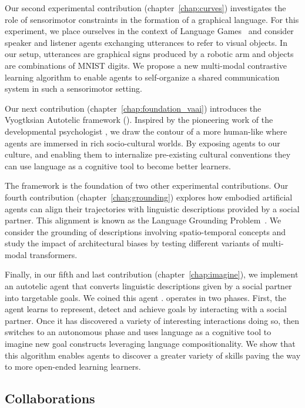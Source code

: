Our second experimental contribution (chapter~\ref{chap:curves}) investigates the role of sensorimotor constraints in the formation of a graphical language. For this experiment, we place ourselves in the context of Language Games~\citep{steels2001language} and consider speaker and listener agents exchanging utterances to refer to visual objects. In our setup,  utterances are graphical signs produced by a robotic arm and objects are combinations of MNIST digits. We propose a new multi-modal contrastive learning algorithm to enable agents to self-organize a shared communication system in such a sensorimotor setting.

Our next contribution (chapter~\ref{chap:foundation_vaai}) introduces the Vyogtksian Autotelic \ai framework (\vaai). Inspired by the pioneering work of the developmental psychologist \citet{vygotsky_thought_1934}, we draw the contour of a more human-like \ai where agents are immersed in rich socio-cultural worlds. By exposing agents to our culture, and enabling them to internalize pre-existing cultural conventions they can use language as a cognitive tool to become better learners. 

The \vaai framework is the foundation of two other experimental contributions. Our fourth contribution (chapter~\ref{chap:grounding}) explores how embodied artificial agents can align their trajectories with linguistic descriptions provided by a social partner. This alignment is known as the Language Grounding Problem~\citep{glenberg_grounding_2002,zwaan_madden_2005}. We consider the grounding of descriptions involving spatio-temporal concepts and study the impact of architectural biases by testing different variants of multi-modal transformers.

Finally, in our fifth and last contribution (chapter~\ref{chap:imagine}), we implement an autotelic agent that converts linguistic descriptions given by a social partner into targetable goals. We coined this agent \imagine. \imagine operates in two phases. First, the agent learns to represent, detect and achieve goals by interacting with a social partner. Once it has discovered a variety of interesting interactions doing so, \imagine then switches to an autonomous phase and uses language as a cognitive tool to imagine new goal constructs leveraging language compositionality. We show that this algorithm enables agents to discover a greater variety of skills paving the way to more open-ended learning learners.



\subsection{Collaborations}

